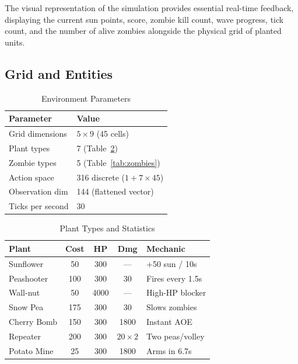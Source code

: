 \documentclass[conference]{IEEEtran}
\begin{document}
The visual representation of the simulation provides essential real-time feedback, displaying the current sun points, score, zombie kill count, wave progress, tick count, and the number of alive zombies alongside the physical grid of planted units.

\subsection{Grid and Entities}

\begin{table}[htbp]
\centering
\caption{Environment Parameters}
\label{tab:env}
\begin{tabular}{@{}ll@{}}
\toprule
\textbf{Parameter} & \textbf{Value} \\
\midrule
Grid dimensions & $5 \times 9$ (45 cells) \\
Plant types & 7 (Table~\ref{tab:plants}) \\
Zombie types & 5 (Table~\ref{tab:zombies}) \\
Action space & 316 discrete ($1 + 7 \times 45$) \\
Observation dim & 144 (flattened vector) \\
Ticks per second & 30 \\
\bottomrule
\end{tabular}
\end{table}

\begin{table}[htbp]
\centering
\caption{Plant Types and Statistics}
\label{tab:plants}
\begin{tabular}{@{}lcccp{2.2cm}@{}}
\toprule
\textbf{Plant} & \textbf{Cost} & \textbf{HP} & \textbf{Dmg} & \textbf{Mechanic} \\
\midrule
Sunflower & 50 & 300 & --- & +50 sun / 10s \\
Peashooter & 100 & 300 & 30 & Fires every 1.5s \\
Wall-nut & 50 & 4000 & --- & High-HP blocker \\
Snow Pea & 175 & 300 & 30 & Slows zombies \\
Cherry Bomb & 150 & 300 & 1800 & Instant AOE \\
Repeater & 200 & 300 & $20{\times}2$ & Two peas/volley \\
Potato Mine & 25 & 300 & 1800 & Arms in 6.7s \\
\bottomrule
\end{tabular}
\end{table}
\end{document}
